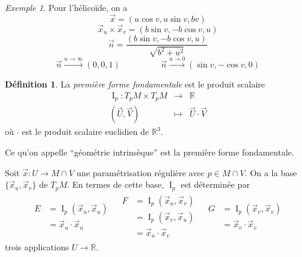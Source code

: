 \documentclass{report}
\theoremstyle{definition}
\newtheorem*{dfn}{D\'efinition}
\theoremstyle{remark}
\newtheorem*{exem}{Exemple}
\def\RR{\mathbb{R}}
\def\pff{\operatorname{I}}
\begin{document}
	\begin{exem}
		Pour l'h\'elico\"ide, on a \[ \vec x = (u\cos v, u\sin v, bv) \] \[ \vec x_u \times \vec x_v = (b\sin v, -b\cos v, u) \] \[ \vec n = \dfrac{(b\sin v, -b\cos v, u)}{\sqrt{b^2+u^2}} \] \[ \vec n \xrightarrow{u\to\infty} (0,0,1) \hspace{2cm} \vec n \xrightarrow{u\to0} (\sin v, -\cos v, 0) \]
	\end{exem}

	\begin{dfn}
		La \emph{premi\`ere forme fondamentale} est le produit scalaire \[ \begin{array}{rcl}
			\pff_p:T_pM \times T_pM&\to&\RR\\
			(\vec U,\vec V)&\mapsto&\vec U \cdot \vec V
		\end{array} \] o\`u $\cdot$ est le produit scalaire euclidien de $\RR^3$.

		Ce qu'on appelle ``g\'eom\'etrie intrins\`eque'' est la premi\`ere forme fondamentale.
	\end{dfn}

	Soit $\vec x:U \to M\cap V$ une param\'etrisation r\'eguli\`ere avec $p\in M\cap V$. On a la base $\{\vec x_u, \vec x_v\}$ de $T_pM$. En termes de cette base, $\pff_p$ est d\'etermin\'ee par
	\begin{align*}
		\begin{split}
			E&= \pff_p(\vec x_u, \vec x_u)\\
			&= \vec x_u \cdot \vec x_u
		\end{split}
		&
		\begin{split}
			F&= \pff_p(\vec x_u, \vec x_v)\\
			&= \pff_p(\vec x_v, \vec x_u)\\
			&= \vec x_u \cdot \vec x_v
		\end{split}
		&
		\begin{split}
			G&= \pff_p(\vec x_v, \vec x_v)\\
			&= \vec x_v \cdot \vec x_v
		\end{split}
	\end{align*}
	trois applications $U\to\RR$.
\end{document}
